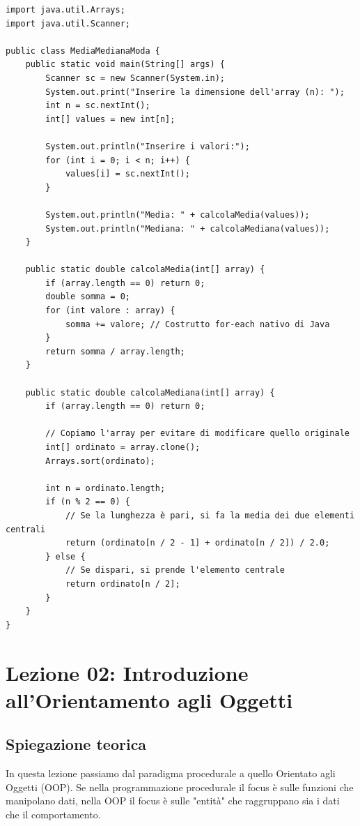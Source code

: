 \documentclass[12pt, a4paper]{article}
\begin{document}
\begin{verbatim}
import java.util.Arrays;
import java.util.Scanner;

public class MediaMedianaModa {
    public static void main(String[] args) {
        Scanner sc = new Scanner(System.in);
        System.out.print("Inserire la dimensione dell'array (n): ");
        int n = sc.nextInt();
        int[] values = new int[n];

        System.out.println("Inserire i valori:");
        for (int i = 0; i < n; i++) {
            values[i] = sc.nextInt();
        }

        System.out.println("Media: " + calcolaMedia(values));
        System.out.println("Mediana: " + calcolaMediana(values));
    }

    public static double calcolaMedia(int[] array) {
        if (array.length == 0) return 0;
        double somma = 0;
        for (int valore : array) {
            somma += valore; // Costrutto for-each nativo di Java
        }
        return somma / array.length;
    }

    public static double calcolaMediana(int[] array) {
        if (array.length == 0) return 0;

        // Copiamo l'array per evitare di modificare quello originale
        int[] ordinato = array.clone();
        Arrays.sort(ordinato);

        int n = ordinato.length;
        if (n % 2 == 0) {
            // Se la lunghezza è pari, si fa la media dei due elementi centrali
            return (ordinato[n / 2 - 1] + ordinato[n / 2]) / 2.0;
        } else {
            // Se dispari, si prende l'elemento centrale
            return ordinato[n / 2];
        }
    }
}
\end{verbatim}

\section{Lezione 02: Introduzione all'Orientamento agli Oggetti}

\subsection{Spiegazione teorica}
In questa lezione passiamo dal paradigma procedurale a quello Orientato agli Oggetti (OOP). Se nella programmazione procedurale il focus è sulle funzioni che manipolano dati, nella OOP il focus è sulle "entità" che raggruppano sia i dati che il comportamento.
\end{document}

